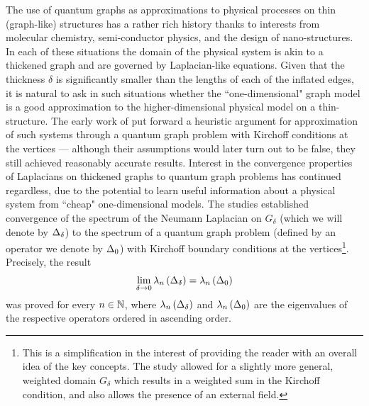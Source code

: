 The use of quantum graphs as approximations to physical processes on thin (graph-like) structures has a rather rich history thanks to interests from molecular chemistry, semi-conductor physics, and the design of nano-structures.
In each of these situations the domain of the physical system is akin to a thickened graph and are governed by Laplacian-like equations.
Given that the thickness $\delta$ is significantly smaller than the lengths of each of the inflated edges, it is natural to ask in such situations whether the ``one-dimensional" graph model is a good approximation to the higher-dimensional physical model on a thin-structure.
The early work of \cite{ruedenberg1953free} put forward a heuristic argument for approximation of such systems through a quantum graph problem with Kirchoff conditions at the vertices --- although their assumptions would later turn out to be false, they still achieved reasonably accurate results.
Interest in the convergence properties of Laplacians on thickened graphs to quantum graph problems has continued regardless, due to the potential to learn useful information about a physical system from ``cheap" one-dimensional models.
The studies \cite{rubinstein2001variational, kuchment2001convergence} established convergence of the spectrum of the Neumann Laplacian on $G_{\delta}$ (which we will denote by $\Delta_{\delta}$) to the spectrum of a quantum graph problem (defined by an operator we denote by $\Delta_0$) with Kirchoff boundary conditions at the vertices\footnote{This is a simplification in the interest of providing the reader with an overall idea of the key concepts. The study \cite{kuchment2001convergence} allowed for a slightly more general, weighted domain $G_{\delta}$ which results in a weighted sum in the Kirchoff condition, and also allows the presence of an external field.}.
Precisely, the result
\begin{align*}
	\lim_{\delta\rightarrow0} \lambda_n\left( \Delta_{\delta} \right) = \lambda_n\left( \Delta_0 \right)
\end{align*}
was proved for every $n\in\mathbb{N}$, where $\lambda_n\left( \Delta_{\delta} \right)$ and $\lambda_n\left( \Delta_0 \right)$ are the eigenvalues of the respective operators ordered in ascending order.

